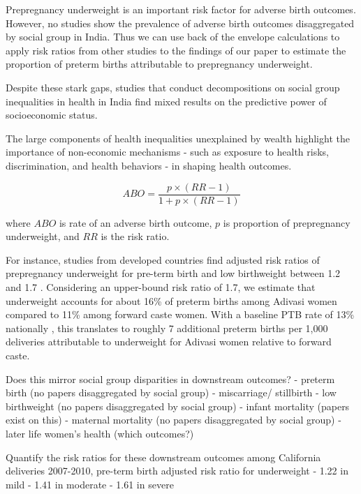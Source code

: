 Prepregnancy underweight is an important risk factor for adverse birth outcomes. However, no studies show the prevalence of adverse birth outcomes disaggregated by social group in India. Thus we can use back of the envelope calculations to apply risk ratios from other studies to the findings of our paper to estimate the proportion of preterm births attributable to prepregnancy underweight. 

Despite these stark gaps, studies that conduct decompositions on social group inequalities in health in India find mixed results on the predictive power of socioeconomic status. 

The large components of health inequalities unexplained by wealth highlight the importance of non-economic mechanisms - such as exposure to health risks, discrimination, and health behaviors - in shaping health outcomes. 



\begin{equation}
    ABO = \frac{p \times(RR-1)}{1+ p\times(RR-1)}    
\end{equation}

where $ABO$ is rate of an adverse birth outcome, $p$ is proportion of prepregnancy underweight, and $RR$ is the risk ratio. 

For instance, studies from developed countries find adjusted risk ratios of prepregnancy underweight for pre-term birth and low birthweight between 1.2 and 1.7 \cite{girsen2016women} \cite{hur2009512} \cite{wenman2004prospective} \cite{diamond2024impact}.
Considering an upper-bound risk ratio of 1.7, we estimate that underweight accounts for about 16\% of preterm births among Adivasi women compared to 11\% among forward caste women. With a baseline PTB rate of 13\% nationally \cite{jana2023correlates}, this translates to roughly 7 additional preterm births per 1,000 deliveries attributable to underweight for Adivasi women relative to forward caste. 

Does this mirror social group disparities in downstream outcomes?
- preterm birth (no papers disaggregated by social group)
- miscarriage/ stillbirth
- low birthweight (no papers disaggregated by social group)
- infant mortality (papers exist on this)
- maternal mortality (no papers disaggregated by social group)
- later life women's health (which outcomes?)


Quantify the risk ratios for these downstream outcomes
\cite{girsen2016women} among California deliveries 2007-2010, pre-term birth adjusted risk ratio for underweight
- 1.22 in mild
- 1.41 in moderate
- 1.61 in severe

